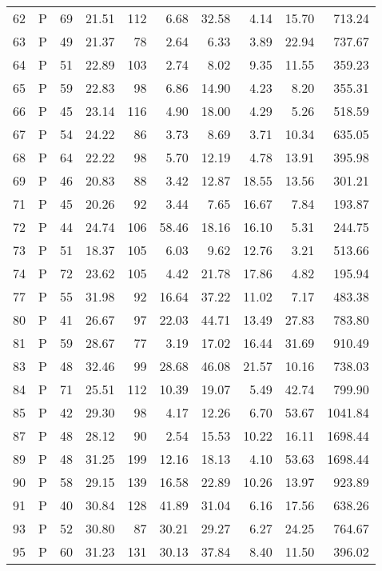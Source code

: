 \begin{table}[ht]
\begin{tabular}{rlrrrrrrrr}
  62 & P &  69 & 21.51 & 112 & 6.68 & 32.58 & 4.14 & 15.70 & 713.24 \\ 
  63 & P &  49 & 21.37 &  78 & 2.64 & 6.33 & 3.89 & 22.94 & 737.67 \\ 
  64 & P &  51 & 22.89 & 103 & 2.74 & 8.02 & 9.35 & 11.55 & 359.23 \\ 
  65 & P &  59 & 22.83 &  98 & 6.86 & 14.90 & 4.23 & 8.20 & 355.31 \\ 
  66 & P &  45 & 23.14 & 116 & 4.90 & 18.00 & 4.29 & 5.26 & 518.59 \\ 
  67 & P &  54 & 24.22 &  86 & 3.73 & 8.69 & 3.71 & 10.34 & 635.05 \\ 
  68 & P &  64 & 22.22 &  98 & 5.70 & 12.19 & 4.78 & 13.91 & 395.98 \\ 
  69 & P &  46 & 20.83 &  88 & 3.42 & 12.87 & 18.55 & 13.56 & 301.21 \\ 
  71 & P &  45 & 20.26 &  92 & 3.44 & 7.65 & 16.67 & 7.84 & 193.87 \\ 
  72 & P &  44 & 24.74 & 106 & 58.46 & 18.16 & 16.10 & 5.31 & 244.75 \\ 
  73 & P &  51 & 18.37 & 105 & 6.03 & 9.62 & 12.76 & 3.21 & 513.66 \\ 
  74 & P &  72 & 23.62 & 105 & 4.42 & 21.78 & 17.86 & 4.82 & 195.94 \\ 
  77 & P &  55 & 31.98 &  92 & 16.64 & 37.22 & 11.02 & 7.17 & 483.38 \\ 
  80 & P &  41 & 26.67 &  97 & 22.03 & 44.71 & 13.49 & 27.83 & 783.80 \\ 
  81 & P &  59 & 28.67 &  77 & 3.19 & 17.02 & 16.44 & 31.69 & 910.49 \\ 
  83 & P &  48 & 32.46 &  99 & 28.68 & 46.08 & 21.57 & 10.16 & 738.03 \\ 
  84 & P &  71 & 25.51 & 112 & 10.39 & 19.07 & 5.49 & 42.74 & 799.90 \\ 
  85 & P &  42 & 29.30 &  98 & 4.17 & 12.26 & 6.70 & 53.67 & 1041.84 \\ 
  87 & P &  48 & 28.12 &  90 & 2.54 & 15.53 & 10.22 & 16.11 & 1698.44 \\ 
  89 & P &  48 & 31.25 & 199 & 12.16 & 18.13 & 4.10 & 53.63 & 1698.44 \\ 
  90 & P &  58 & 29.15 & 139 & 16.58 & 22.89 & 10.26 & 13.97 & 923.89 \\ 
  91 & P &  40 & 30.84 & 128 & 41.89 & 31.04 & 6.16 & 17.56 & 638.26 \\ 
  93 & P &  52 & 30.80 &  87 & 30.21 & 29.27 & 6.27 & 24.25 & 764.67 \\ 
  95 & P &  60 & 31.23 & 131 & 30.13 & 37.84 & 8.40 & 11.50 & 396.02 \\ 

\end{tabular}
\end{table}
